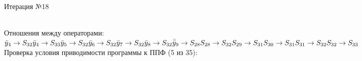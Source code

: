 \documentclass[a4paper,14pt]{article}
\begin{document}
\newpage \\ 
\begin{center}\huge Итерация №18 \end{center}\\
Отношения между операторами: \\ \newline
\begin{math}
    \bar{y}_{4} \rightarrow S_{32} \\ 
\bar{y}_{4} \rightarrow S_{33} \\ 
\bar{y}_{5} \rightarrow S_{32} \\ 
\bar{y}_{6} \rightarrow S_{32} \\ 
\bar{y}_{7} \rightarrow S_{32} \\ 
\bar{y}_{8} \rightarrow S_{32} \\ 
\bar{\bar{y}}_{9} \rightarrow S_{28} \\ 
S_{28} \rightarrow S_{32} \\ 
S_{29} \rightarrow S_{31} \\ 
S_{30} \rightarrow S_{31} \\ 
S_{31} \rightarrow S_{32} \\ 
S_{32} \rightarrow S_{33}
\end{math}\\ \newline
%
Проверка условия приводимости программы к ППФ (5 из 35): \\
\end{document}
